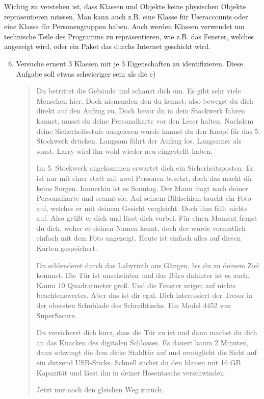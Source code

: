     \begin{Infobox}
        Wichtig zu verstehen ist, dass Klassen und Objekte keine physischen Objekte repräsentieren müssen. Man kann auch z.B. eine Klasse für Useraccounts oder eine Klasse für Personengruppen haben. Auch werden Klassen verwendet um technische Teile des Programms zu repräsentieren, wie z.B. das Fenster, welches angezeigt wird, oder ein Paket das durchs Internet geschickt wird.
    \end{Infobox}


\begin{enumerate} \setcounter{enumi}{5}
    \item \optional Versuche erneut 3 Klassen mit je 3 Eigenschaften  zu identifizieren. Diese Aufgabe soll etwas schwieriger sein als die c)
    \begin{quotation}
    Du betrittst die Gebäude und schaust dich um. Es gibt sehr viele Menschen hier. Doch niemanden den du kennst, also bewegst du dich direkt auf den Aufzug zu. Doch bevor du in dein Stockwerk fahren kannst, musst du deine Personalkarte vor den Leser halten. Nachdem deine Sicherheitsstufe ausgelesen wurde kannst du den Knopf für das 5. Stockwerk drücken. Langsam fährt der Aufzug los. Langsamer als sonst. Larry wird ihn wohl wieder neu eingestellt haben.

    Im 5. Stockwerk angekommen erwartet dich ein Sicherheitsposten. Er ist nur mit einer statt mit zwei Personen besetzt, doch das macht dir keine Sorgen. Immerhin ist es Sonntag. Der Mann fragt nach deiner Personalkarte und scannt sie. Auf seinem Bildschirm taucht ein Foto auf, welches er mit deinem Gesicht vergleicht. Doch ihm fällt nichts auf. Also grüßt er dich und lässt dich vorbei. Für einen Moment fragst du dich, woher er deinen Namen kennt, doch der wurde vermutlich einfach mit dem Foto angezeigt. Heute ist einfach alles auf diesen Karten gespeichert.

    Du schlenderst durch das Labyrinth aus Gängen, bis du zu deinem Ziel kommst. Die Tür ist unscheinbar und das Büro dahinter ist es auch. Kaum 10 Quadratmeter groß. Und die Fenster zeigen auf nichts beachtenswertes. Aber das ist dir egal. Dich interessiert der Tresor in der obersten Schublade des Schreibtischs. Ein Model 4452 von SuperSecure.

    Du versicherst dich kurz, dass die Tür zu ist und dann machst du dich an das Knacken des digitalen Schlosses. Es dauert kaum 2 Minuten, dann schwingt die 3cm dicke Stahltür auf und ermöglicht die Sicht auf ein dutzend USB-Sticks. Schnell suchst du den blauen mit 16 GB Kapazität und lässt ihn in deiner Hosentasche verschwinden.

    Jetzt nur noch den gleichen Weg zurück.
    \end{quotation}
\end{enumerate}
